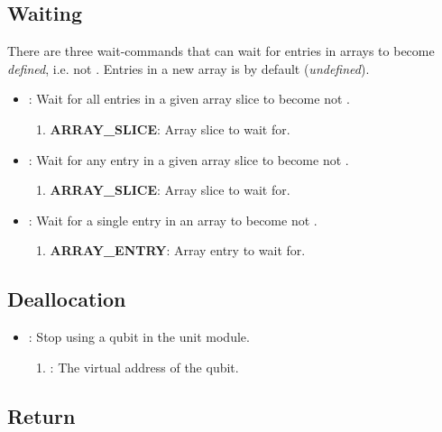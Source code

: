 \subsection{Waiting}\label{app:waiting}

There are three wait-commands that can wait for entries in arrays to become \emph{defined}, i.e. not .
Entries in a new array is by default  (\emph{undefined}).
\begin{itemize}
  \item {}: Wait for all entries in a given array slice to become not .
        \begin{enumerate}
          \item \textbf{ARRAY\_SLICE}: Array slice to wait for.
        \end{enumerate}
  \item {}: Wait for any entry in a given array slice to become not .
        \begin{enumerate}
          \item \textbf{ARRAY\_SLICE}: Array slice to wait for.
        \end{enumerate}
  \item {}: Wait for a single entry in an array to become not .
        \begin{enumerate}
          \item \textbf{ARRAY\_ENTRY}: Array entry to wait for.
        \end{enumerate}
\end{itemize}

\subsection{Deallocation}
\begin{itemize}
  \item {}: Stop using a qubit in the unit module.
        \begin{enumerate}
          \item \REGISTER: The virtual address of the qubit.
        \end{enumerate}
\end{itemize}


\subsection{Return}

